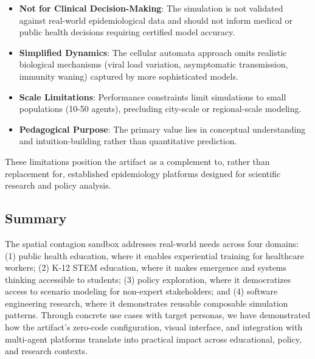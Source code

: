 \begin{itemize}
    \item \textbf{Not for Clinical Decision-Making}: The simulation is not validated against real-world epidemiological data and should not inform medical or public health decisions requiring certified model accuracy.
    
    \item \textbf{Simplified Dynamics}: The cellular automata approach omits realistic biological mechanisms (viral load variation, asymptomatic transmission, immunity waning) captured by more sophisticated models.
    
    \item \textbf{Scale Limitations}: Performance constraints limit simulations to small populations (10-50 agents), precluding city-scale or regional-scale modeling.
    
    \item \textbf{Pedagogical Purpose}: The primary value lies in conceptual understanding and intuition-building rather than quantitative prediction.
\end{itemize}

These limitations position the artifact as a complement to, rather than replacement for, established epidemiology platforms designed for scientific research and policy analysis.

\subsection{Summary}

The spatial contagion sandbox addresses real-world needs across four domains: (1) public health education, where it enables experiential training for healthcare workers; (2) K-12 STEM education, where it makes emergence and systems thinking accessible to students; (3) policy exploration, where it democratizes access to scenario modeling for non-expert stakeholders; and (4) software engineering research, where it demonstrates reusable composable simulation patterns. Through concrete use cases with target personas, we have demonstrated how the artifact's zero-code configuration, visual interface, and integration with multi-agent platforms translate into practical impact across educational, policy, and research contexts.
